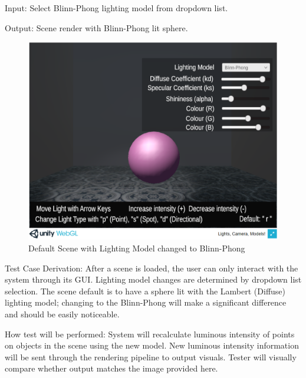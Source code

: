 \documentclass[12pt, titlepage]{article}
\begin{document}
\begin{enumerate}
	Input: Select Blinn-Phong lighting model from dropdown list. 
	
	Output: Scene render with Blinn-Phong lit sphere.
	
	\begin{figure}[h]
		\centering
		\includegraphics[scale=0.25]{./images/sphere-lit-blinnphong}
		\caption{Default Scene with Lighting Model changed to Blinn-Phong}
		\label{fig:blinnPhong}
	\end{figure}
	
	Test Case Derivation: After a scene is loaded, the user can only interact 
	with the system through its GUI. Lighting model changes are determined by 
	dropdown list selection. The scene default is to have a sphere lit with the 
	Lambert (Diffuse) lighting model; changing to the Blinn-Phong will make a 
	significant difference and should be easily noticeable.
	
	How test will be performed: System will recalculate luminous intensity of 
	points on objects in the scene using the new model. New luminous intensity 
	information will be sent through the rendering pipeline to output        
	visuals. Tester will visually compare whether output matches the image 
	provided here. 
	
\end{enumerate}
\end{document}
